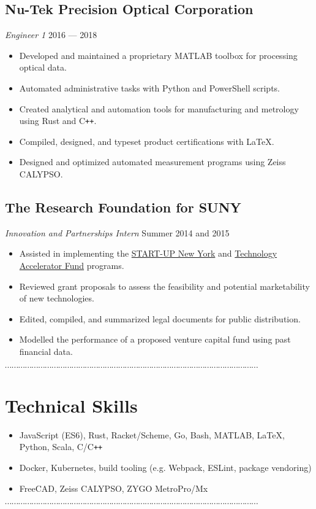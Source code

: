 \documentclass[10pt]{article}
\newcommand{\dotfringe}{
    \begin{center}
      $\cdots\cdots\cdots\cdots\cdots\cdots\cdots\cdots\cdots\cdots\cdots\cdots\cdots\cdots\cdots\cdots\cdots\cdots\cdots\cdots\cdots\cdots\cdots\cdots\cdots\cdots\cdots\cdots\cdots\cdots\cdots\cdots\cdots\cdots\cdots\cdots\cdots\cdots$
    \end{center}
}
\begin{document}
\subsection*{Nu-Tek Precision Optical Corporation}
\textit{Engineer 1} \hfill 2016 --- 2018
\begin{itemize}
  \item Developed and maintained a proprietary MATLAB toolbox for processing optical data.
  \item Automated administrative tasks with Python and PowerShell scripts.
  \item Created analytical and automation tools for manufacturing and metrology using Rust and C\texttt{++}.
  \item Compiled, designed, and typeset product  certifications with \LaTeX.
  \item Designed and optimized automated measurement programs using Zeiss CALYPSO.\@
\end{itemize}
\subsection*{The Research Foundation for SUNY}
\textit{Innovation and Partnerships Intern} \hfill Summer 2014 and 2015
\begin{itemize}
  \item Assisted in implementing the \href{https://esd.ny.gov/startup-ny-program}{START-UP New York} and \href{https://www.rfsuny.org/Our-Work/Innovation-and-Partnerships/Programs/Technology-Accelerator-Fund/}{Technology Accelerator Fund} programs.
  \item Reviewed grant proposals to assess the feasibility and potential marketability of new technologies.
  \item Edited, compiled, and summarized legal documents for public distribution.
  \item Modelled the performance of a proposed venture capital fund using past financial data.
\end{itemize}
\dotfringe{}
\section*{Technical Skills}
\begin{itemize}
  \item JavaScript (ES6), Rust, Racket/Scheme, Go, Bash, MATLAB, \LaTeX, Python, Scala, C/C\texttt{++}
  \item Docker, Kubernetes, build tooling (e.g. Webpack, ESLint, package vendoring)
  \item FreeCAD, Zeiss CALYPSO, ZYGO MetroPro/Mx
\end{itemize}

\dotfringe{}
\end{document}
